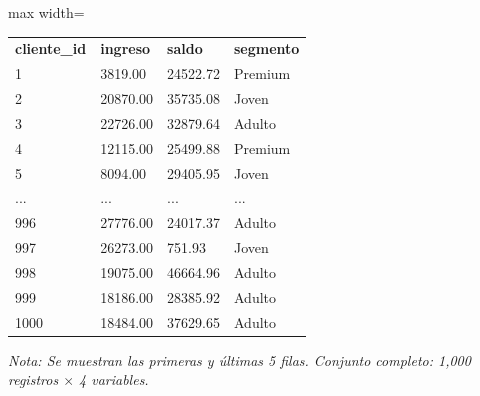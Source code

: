 

\begin{table}[htbp]

\centering

\begin{adjustbox}{max width=\textwidth}

\begin{tabular}{llll}

\rowcolor{ThemeBackground}
\rule{0pt}{0.45cm}
\textcolor{ThemeGold}{\bfseries cliente\_id} & \textcolor{ThemeGold}{\bfseries ingreso} & \textcolor{ThemeGold}{\bfseries saldo} & \textcolor{ThemeGold}{\bfseries segmento} \\

1 & 3819.00 & 24522.72 & Premium \\
2 & 20870.00 & 35735.08 & Joven \\
3 & 22726.00 & 32879.64 & Adulto \\
4 & 12115.00 & 25499.88 & Premium \\
5 & 8094.00 & 29405.95 & Joven \\
... & ... & ... & ... \\
996 & 27776.00 & 24017.37 & Adulto \\
997 & 26273.00 & 751.93 & Joven \\
998 & 19075.00 & 46664.96 & Adulto \\
999 & 18186.00 & 28385.92 & Adulto \\
1000 & 18484.00 & 37629.65 & Adulto \\
\bottomrule
\end{tabular}

\end{adjustbox}

\vspace{0.15cm}
{\raggedright\sffamily\footnotesize\color{ThemeMuted}
\textit{Nota: Se muestran las primeras y últimas 5 filas. Conjunto completo: 1,000 registros $\times$ 4 variables.}}

\end{table}
